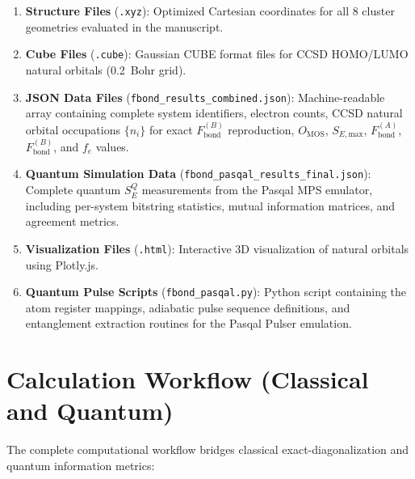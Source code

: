 \documentclass[12pt,a4paper]{article}
\begin{document}
\begin{enumerate}
  \item \textbf{Structure Files} (\texttt{.xyz}):
    Optimized Cartesian coordinates for all 8 cluster geometries
    evaluated in the manuscript.

  \item \textbf{Cube Files} (\texttt{.cube}):
    Gaussian CUBE format files for CCSD HOMO/LUMO natural orbitals
    (0.2~Bohr grid).

  \item \textbf{JSON Data Files} (\texttt{fbond\_results\_combined.json}):
    Machine-readable array containing complete system identifiers,
    electron counts, CCSD natural orbital occupations $\{n_i\}$ for
    exact $F_{\text{bond}}^{(B)}$ reproduction, $O_{\text{MOS}}$,
    $S_{E,\text{max}}$, $F_{\text{bond}}^{(A)}$,
    $F_{\text{bond}}^{(B)}$, and $f_e$ values.

  \item \textbf{Quantum Simulation Data}
    (\texttt{fbond\_pasqal\_results\_final.json}):
    Complete quantum $S_E^{Q}$ measurements from the Pasqal MPS
    emulator, including per-system bitstring statistics, mutual
    information matrices, and agreement metrics.

  \item \textbf{Visualization Files} (\texttt{.html}):
    Interactive 3D visualization of  natural orbitals
    using Plotly.js.

  \item \textbf{Quantum Pulse Scripts}
    (\texttt{fbond\_pasqal.py}):
    Python script containing the atom register mappings, adiabatic
    pulse sequence definitions, and entanglement extraction routines
    for the Pasqal Pulser emulation.
\end{enumerate}

\section{Calculation Workflow (Classical and Quantum)}

The complete computational workflow bridges classical exact-diagonalization
and quantum information metrics:
\end{document}
